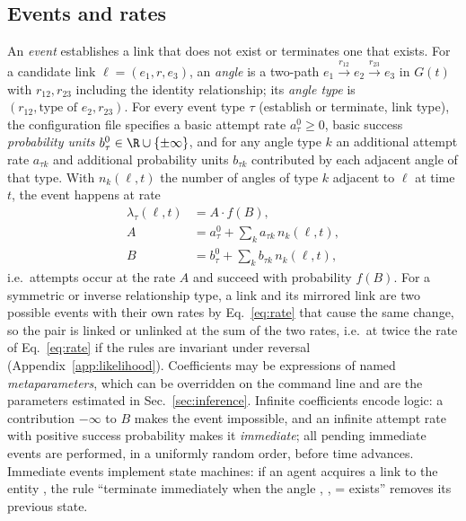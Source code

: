 \subsection{Events and rates}
An \emph{event} establishes a link that does not exist or terminates one that exists.
For a candidate link $\ell = (e_1, r, e_3)$, an \emph{angle} is a two-path $e_1 \xrightarrow{r_{12}} e_2 \xrightarrow{r_{23}} e_3$ in $G(t)$ with $r_{12}, r_{23}$ including the identity relationship; its \emph{angle type} is $(r_{12}, \text{type of } e_2, r_{23})$.
For every event type $\tau$ (establish or terminate, link type), the configuration file specifies a basic attempt rate $a^0_\tau \ge 0$, basic success \emph{probability units} $b^0_\tau \in \R \cup \{\pm\infty\}$, and for any angle type $k$ an additional attempt rate $a_{\tau k}$ and additional probability units $b_{\tau k}$ contributed by each adjacent angle of that type.
With $n_k(\ell, t)$ the number of angles of type $k$ adjacent to $\ell$ at time $t$, the event happens at rate
\begin{equation}\label{eq:rate}
\begin{aligned}
  \lambda_\tau(\ell, t) &= A \cdot f(B), \\
  A &= a^0_\tau + \textstyle\sum_k a_{\tau k}\, n_k(\ell,t), \\
  B &= b^0_\tau + \textstyle\sum_k b_{\tau k}\, n_k(\ell,t),
\end{aligned}
\end{equation}
i.e.\ attempts occur at the rate $A$ and succeed with probability $f(B)$.
For a symmetric or inverse relationship type, a link and its mirrored link are two possible events with their own rates by Eq.~\eqref{eq:rate} that cause the same change, so the pair is linked or unlinked at the sum of the two rates, i.e.\ at twice the rate of Eq.~\eqref{eq:rate} if the rules are invariant under reversal (Appendix~\ref{app:likelihood}).
Coefficients may be expressions of named \emph{metaparameters}, which can be overridden on the command line and are the parameters estimated in Sec.~\ref{sec:inference}.
Infinite coefficients encode logic: a contribution $-\infty$ to $B$ makes the event impossible, and an infinite attempt rate with positive success probability makes it \emph{immediate}; all pending immediate events are performed, in a uniformly random order, before time advances.
Immediate events implement state machines: if an agent acquires a link  to the entity , the rule ``terminate  immediately when the angle , , = exists'' removes its previous state.

